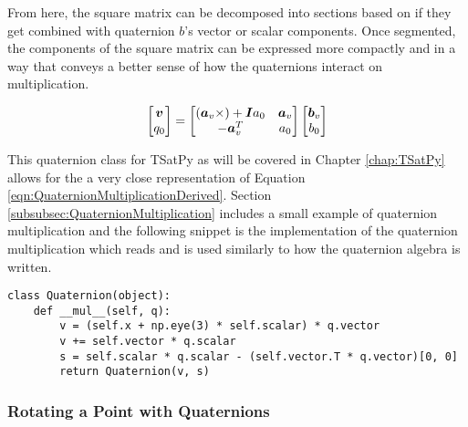 From here, the square matrix can be decomposed into sections based on if they get combined with quaternion $b$'s vector or scalar components.  Once segmented, the components of the square matrix can be expressed more compactly and in a way that conveys a better sense of how the quaternions interact on multiplication.

\begin{equation}
  \begin{bmatrix} \boldsymbol{v} \\ q_0 \end{bmatrix} =
  \begin{bmatrix}
    (\boldsymbol{a}_v \times) + \boldsymbol{I} a_0 & \boldsymbol{a}_v \\
    -\boldsymbol{a}_v^T                    & a_0 \\
  \end{bmatrix}
  \begin{bmatrix}
  \boldsymbol{b}_v \\ b_0
  \end{bmatrix}
  \label{eqn:QuaternionMultiplicationDerived}
\end{equation}

This quaternion class for TSatPy as will be covered in Chapter \ref{chap:TSatPy} allows for the a very close representation of Equation \ref{eqn:QuaternionMultiplicationDerived}.  Section \ref{subsubsec:QuaternionMultiplication} includes a small example of quaternion multiplication and the following snippet is the implementation of the quaternion multiplication which reads and is used similarly to how the quaternion algebra is written.

\begin{singlespace}
  \begin{verbatim}
class Quaternion(object):
    def __mul__(self, q):
        v = (self.x + np.eye(3) * self.scalar) * q.vector
        v += self.vector * q.scalar
        s = self.scalar * q.scalar - (self.vector.T * q.vector)[0, 0]
        return Quaternion(v, s)
  \end{verbatim}
  \nocite{minted}
\end{singlespace}

\subsubsection{Rotating a Point with Quaternions}
\label{subsubsec:RotatingaPointwithQuaternions}

